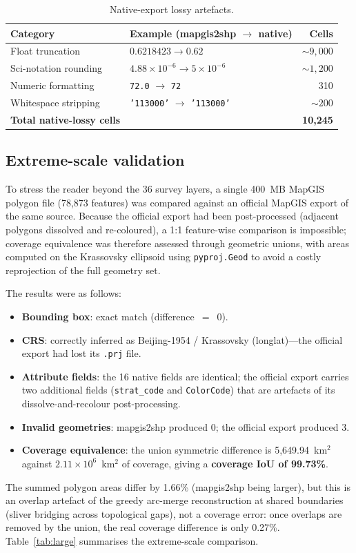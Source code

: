 \documentclass[11pt,a4paper]{article}
\begin{document}
\begin{table}[h]
\centering
\caption{Native-export lossy artefacts.}
\label{tab:lossy}
\begin{tabular}{llr}
\toprule
Category & Example (mapgis2shp $\rightarrow$ native) & Cells \\
\midrule
Float truncation & $0.6218423 \rightarrow 0.62$ & ${\sim}9{,}000$ \\
Sci-notation rounding & $4.88\times10^{-6} \rightarrow 5\times10^{-6}$ & ${\sim}1{,}200$ \\
Numeric formatting & \texttt{72.0} $\rightarrow$ \texttt{72} & 310 \\
Whitespace stripping & \texttt{'113000\quad'} $\rightarrow$ \texttt{'113000'} & ${\sim}200$ \\
\midrule
\textbf{Total native-lossy cells} & & \textbf{10{,}245} \\
\bottomrule
\end{tabular}
\end{table}

\subsection{Extreme-scale validation}
\label{sec:largescale}
To stress the reader beyond the 36 survey layers, a single 400~MB MapGIS polygon file (78{,}873 features) was compared against an official MapGIS export of the same source. Because the official export had been post-processed (adjacent polygons dissolved and re-coloured), a 1:1 feature-wise comparison is impossible; coverage equivalence was therefore assessed through geometric unions, with areas computed on the Krassovsky ellipsoid using \texttt{pyproj.Geod} to avoid a costly reprojection of the full geometry set.

The results were as follows:
\begin{itemize}
  \item \textbf{Bounding box}: exact match (difference~$=$~0).
  \item \textbf{CRS}: correctly inferred as Beijing-1954 / Krassovsky (longlat)---the official export had lost its \texttt{.prj} file.
  \item \textbf{Attribute fields}: the 16 native fields are identical; the official export carries two additional fields (\texttt{strat\_code} and \texttt{ColorCode}) that are artefacts of its dissolve-and-recolour post-processing.
  \item \textbf{Invalid geometries}: mapgis2shp produced 0; the official export produced 3.
  \item \textbf{Coverage equivalence}: the union symmetric difference is 5{,}649.94~km$^{2}$ against $2.11\times10^{6}$~km$^{2}$ of coverage, giving a \textbf{coverage IoU of 99.73\%}.
\end{itemize}
The summed polygon areas differ by 1.66\% (mapgis2shp being larger), but this is an overlap artefact of the greedy arc-merge reconstruction at shared boundaries (sliver bridging across topological gaps), not a coverage error: once overlaps are removed by the union, the real coverage difference is only 0.27\%. Table~\ref{tab:large} summarises the extreme-scale comparison.
\end{document}
